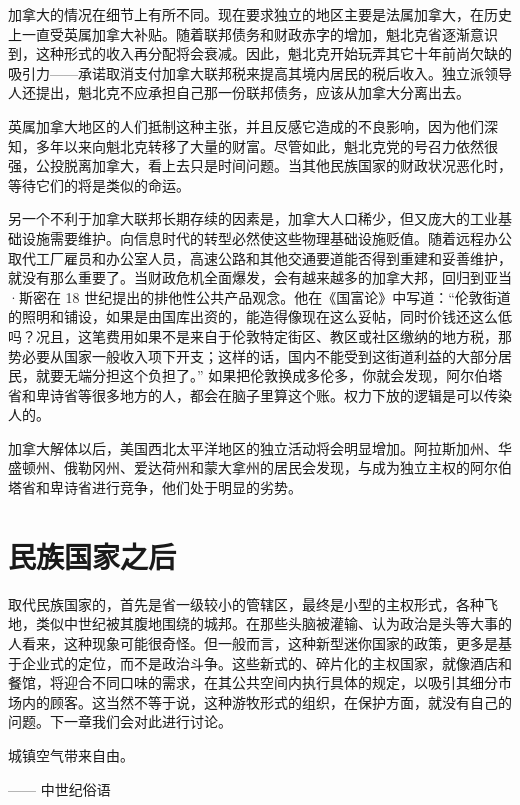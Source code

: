 加拿大的情况在细节上有所不同。现在要求独立的地区主要是法属加拿大，在历史上一直受英属加拿大补贴。随着联邦债务和财政赤字的增加，魁北克省逐渐意识到，这种形式的收入再分配将会衰减。因此，魁北克开始玩弄其它十年前尚欠缺的吸引力——承诺取消支付加拿大联邦税来提高其境内居民的税后收入。独立派领导人还提出，魁北克不应承担自己那一份联邦债务，应该从加拿大分离出去。

英属加拿大地区的人们抵制这种主张，并且反感它造成的不良影响，因为他们深知，多年以来向魁北克转移了大量的财富。尽管如此，魁北克党的号召力依然很强，公投脱离加拿大，看上去只是时间问题。当其他民族国家的财政状况恶化时，等待它们的将是类似的命运。

另一个不利于加拿大联邦长期存续的因素是，加拿大人口稀少，但又庞大的工业基础设施需要维护。向信息时代的转型必然使这些物理基础设施贬值。随着远程办公取代工厂雇员和办公室人员，高速公路和其他交通要道能否得到重建和妥善维护，就没有那么重要了。当财政危机全面爆发，会有越来越多的加拿大邦，回归到亚当·斯密在 18 世纪提出的排他性公共产品观念。他在《国富论》中写道：“伦敦街道的照明和铺设，如果是由国库出资的，能造得像现在这么妥帖，同时价钱还这么低吗？况且，这笔费用如果不是来自于伦敦特定街区、教区或社区缴纳的地方税，那势必要从国家一般收入项下开支；这样的话，国内不能受到这街道利益的大部分居民，就要无端分担这个负担了。” 如果把伦敦换成多伦多，你就会发现，阿尔伯塔省和卑诗省等很多地方的人，都会在脑子里算这个账。权力下放的逻辑是可以传染人的。

加拿大解体以后，美国西北太平洋地区的独立活动将会明显增加。阿拉斯加州、华盛顿州、俄勒冈州、爱达荷州和蒙大拿州的居民会发现，与成为独立主权的阿尔伯塔省和卑诗省进行竞争，他们处于明显的劣势。

\section{民族国家之后}
取代民族国家的，首先是省一级较小的管辖区，最终是小型的主权形式，各种飞地，类似中世纪被其腹地围绕的城邦。在那些头脑被灌输、认为政治是头等大事的人看来，这种现象可能很奇怪。但一般而言，这种新型迷你国家的政策，更多是基于企业式的定位，而不是政治斗争。这些新式的、碎片化的主权国家，就像酒店和餐馆，将迎合不同口味的需求，在其公共空间内执行具体的规定，以吸引其细分市场内的顾客。这当然不等于说，这种游牧形式的组织，在保护方面，就没有自己的问题。下一章我们会对此进行讨论。

\begin{tcolorbox}
\kaishu 城镇空气带来自由。
\begin{flushright}
—— 中世纪俗语
\end{flushright}
\end{tcolorbox}

